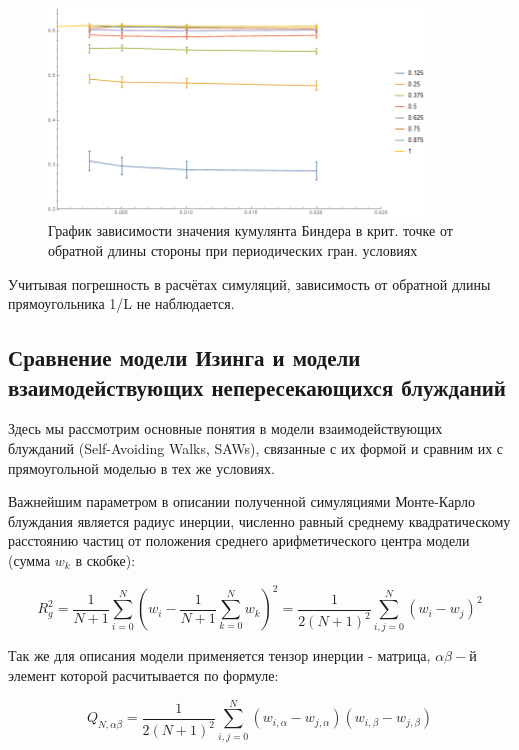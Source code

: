 \begin{figure}[!h]
    \centering
    \includegraphics[width=100mm]{Sections/Images/CumulantPBCL.png}
    \caption{График зависимости значения кумулянта Биндера в крит. точке от обратной длины стороны при периодических гран. условиях}
    \label{fig:CumulPBCL}
\end{figure}

Учитывая погрешность в расчётах симуляций, зависимость от обратной длины прямоугольника 1/L не наблюдается.

\subsection{Сравнение модели Изинга и модели взаимодействующих непересекающихся блужданий}

Здесь мы рассмотрим основные понятия в модели взаимодействующих блужданий (Self-Avoiding Walks, SAWs), связанные с их формой и сравним их с прямоугольной моделью в тех же условиях. 

Важнейшим параметром в описании полученной симуляциями Монте-Карло блуждания является радиус инерции, численно равный среднему квадратическому расстоянию частиц от положения среднего арифметического центра модели (сумма $w_{k}$ в скобке):

\begin{equation}\label{eq:Rg}
    R^{2}_{g} = \frac{1}{N+1} \sum^{N}_{i=0}\left(w_{i} - \frac{1}{N+1}\sum^{N}_{k=0}w_{k}\right)^2 = \frac{1}{2(N+1)^{2}}\sum^{N}_{i,j=0}(w_{i} - w_{j})^{2}
\end{equation}

Так же для описания модели применяется тензор инерции - матрица, $\alpha\beta-$й элемент которой расчитывается по формуле:

\begin{equation}\label{eq:Ten_G1}
    Q_{N,\alpha\beta} = \frac{1}{2(N+1)^{2}} \sum^{N}_{i,j=0}(w_{i,\alpha} - w_{j, \alpha})(w_{i,\beta} - w_{j, \beta})
\end{equation}


